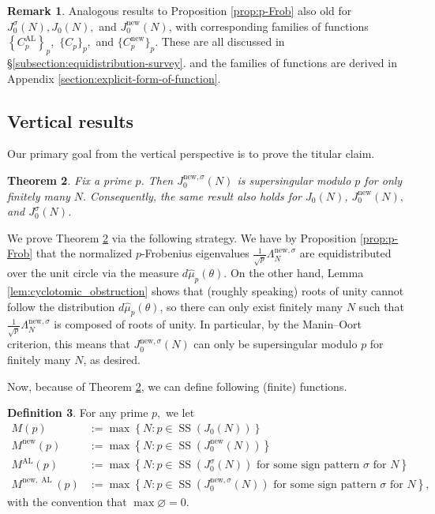 \documentclass[11pt,letterpaper,reqno]{amsart}
\newtheorem{theorem}{Theorem}[section]
\theoremstyle{definition}
\newtheorem{definition}[theorem]{Definition}
\newtheorem{remark}[theorem]{Remark}
\numberwithin{equation}{section}
\numberwithin{figure}{section}
\numberwithin{table}{section}
\let\subsectiontemp\subsection
\renewcommand{\subsection}[1]{ 
    \subsectiontemp{#1} \hfill\vspace{0.5\linespacing} 
}
\newcommand{\nw}{\mathrm{new}}
\begin{document}
\begin{remark}
    Analogous results to Proposition \ref{prop:p-Frob} also old for $J_0^{\sigma}(N), J_0(N),$ and $J_0^{\nw}(N)$, with corresponding families of functions $\left\{C_p^{\operatorname{AL}}\right\}_p,$ $\{C_p\}_p,$ and $\{C_p^\nw\}_p.$ These are all discussed in \S\ref{subsection:equidistribution-survey}. and the families of functions are derived in Appendix \ref{section:explicit-form-of-function}.
\end{remark}



\subsection{Vertical results}\label{subsection:vertical-results}

Our primary goal from the vertical perspective is to prove the titular claim.

\begin{theorem}\label{thm:finiteness-of-supersingularity}
    Fix a prime $p$. Then $J_0^{\nw, \sigma}(N)$ is supersingular modulo $p$ for only finitely many $N.$
    Consequently, the same result also holds for $J_0(N)$, $J_0^\nw(N),$ and $J_0^{\sigma}(N)$.
\end{theorem}

We prove Theorem \ref{thm:finiteness-of-supersingularity} via the following strategy. 
We have by Proposition \ref{prop:p-Frob} that the normalized $p$-Frobenius eigenvalues $\frac{1}{\sqrt p} \Lambda_N^{\nw, \sigma}$ are equidistributed over the unit circle via the measure $d\hat{\mu}_p(\theta)$. On the other hand, Lemma \ref{lem:cyclotomic_obstruction} shows that (roughly speaking) roots of unity cannot follow the distribution $d\hat{\mu}_p(\theta)$, so there can only exist finitely many $N$ such that $\frac{1}{\sqrt{p}} \Lambda_N^{\nw, \sigma}$ is composed of roots of unity. In particular, by the Manin--Oort criterion, this means that $J_0^{\mathrm{new},\sigma}(N)$ can only be supersingular modulo $p$ for finitely many $N$, as desired. 


Now, because of Theorem \ref{thm:finiteness-of-supersingularity}, we can define following (finite) functions.

\begin{definition}\label{defn:M(p)}
    For any prime $p,$ we let
\begin{align}
    M(p) &:=  \max \left\{ N  : p \in \operatorname{SS}\!\left(J_0(N) \right)  \right\}\\
    M^{\nw}(p) &:= \max \left\{ N  : p \in \operatorname{SS}\!\left(J_0^\nw(N) \right)  \right\}\\
    M^{\operatorname{AL}}(p) &:= \max \left\{ N  : p \in \operatorname{SS}\!\left(J_0^\sigma(N) \right) \text{ for some sign pattern $\sigma$ for $N$} \right\}\\
    M^{\nw, \operatorname{AL}}(p) &:= \max \left\{ N  : p \in \operatorname{SS}\!\left(J_0^{\nw, \sigma}(N) \right) \text{ for some sign pattern $\sigma$ for $N$} \right\},
\end{align}
with the convention that $\max \varnothing = 0.$
\end{definition}
\end{document}
